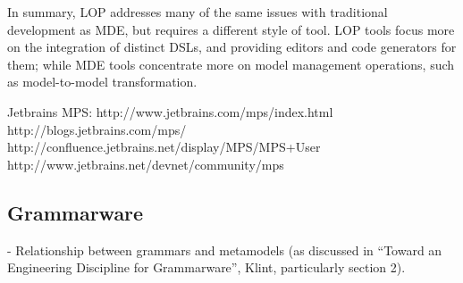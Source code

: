In summary, LOP addresses many of the same issues with traditional development as MDE, but requires a different style of tool. LOP tools focus more on the integration of distinct DSLs, and providing editors and code generators for them; while MDE tools concentrate more on model management operations, such as model-to-model transformation.

Jetbrains MPS:
http://www.jetbrains.com/mps/index.html
http://blogs.jetbrains.com/mps/
http://confluence.jetbrains.net/display/MPS/MPS+User%
http://www.jetbrains.net/devnet/community/mps


\subsection{Grammarware}
\label{subsec:grammarware}
- Relationship between grammars and metamodels (as discussed in ``Toward an Engineering Discipline for Grammarware'', Klint, particularly section 2).